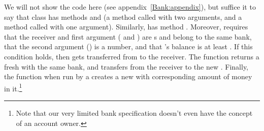 We will not show the code  here (see appendix~\ref{Bank:appendix}), but suffice it to say that class 
 has  methods  and 
  (\ie a method called 
with two arguments, and a method called 
with one argument). Similarly,  has method  .
Moreover,  requires that the receiver and
first argument  ( and ) are s
and belong to the same bank,
that the second argument () is a number, and that 's
balance is at least .
If this condition  holds, then %
  gets transferred from  to the receiver.
 The function   returns a fresh  with the same bank, and transfers 
 from the receiver  to the new .
 Finally, the function  when run by a  creates a new  with corresponding 
 amount of money in it.\footnote{{Note that our very limited bank specification doesn't even have the concept of an account owner.}}
%
